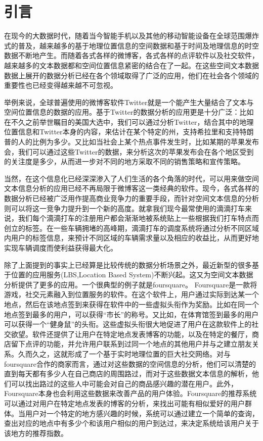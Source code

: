 \chapter{引言}

在现今的大数据时代，随着当今智能手机以及其他的移动智能设备在全球范围爆炸式的普及，越来越多的基于地理位置信息的空间数据和基于时间及地理信息的时空数据不断地产生。而随着各式各样的微博客，各式各样的点评软件以及社交软件，越来越多的文本数据都和空间位置信息紧密的结合在了一起。在这些空间文本数据数据上展开的数据分析已经在各个领域取得了广泛的应用，他们在社会各个领域的重要性也已经变得越来越不可忽视。

举例来说，全球普遍使用的微博客软件Twitter就是一个能产生大量结合了文本与空间位置信息的数据的应用。基于Twitter的数据分析的应用更是十分广泛：比如在不久之前举世瞩目的美国大选中，我们可以通过分析Twitter，结合其中的地理位置信息和Twitter本身的内容，来估计在某个特定的州，支持希拉里和支持特朗普的人的比例为多少。又比如当社会上某个热点事件发生时，比如某期的苹果发布会，我们可以通过这些Twitter的数据，来分析这次的苹果发布会在各个地区受到的关注度是多少，从而进一步对不同的地方采取不同的销售策略和宣传策略。

当然，在这个信息化已经深深渗入了人们生活的各个角落的时代，可以用来做空间文本信息分析的应用已经不再局限于微博客这一类经典的软件。现今，各式各样的数据分析已经被广泛用作提高商业竞争力的重要手段，而针对空间文本信息的分析则可以将这一竞争力提升到一个新的高度。就拿我们现今最常使用的滴滴打车来说，我们每个滴滴打车的注册用户都会渐渐地被系统贴上一些根据我们打车特点而创立的标签。在一些车辆拥堵的高峰期，滴滴打车的调度系统将通过分析不同区域内用户的标签信息，来预计不同区域的车辆需求量以及相应的收益比，从而更好地实现车辆调度而使利益获得最大化。

除了上面提到的事实上已经算是比较传统的数据分析场景之外，最近新型的很多基于位置的应用服务(LBS,Location Based System)不断兴起。这又为空间文本数据分析提供了更多的应用。一个很典型的例子就是foursquare。 Foursquare是一款将游戏，社交元素融入到位置服务的软件。在这个软件上，用户通过实际到达某一个地点，然后在该地点签到来获得在软件中的一些虚拟头衔作为奖励。比如在同一个地点签到最多的用户，可以获得“市长”的称号。又比如，在体育馆签到最多的用户可以获得一个“健身鼠”的头衔。这些虚拟头衔很大地促进了用户在这款软件上的社交欲望。软件还提供了让用户在特定地点发表博客的功能，以及在特定的餐厅，商店留下点评的功能，并允许用户联系到过同一个地点的其他用户并与之建立朋友关系。久而久之，这就形成了一个基于实时地理位置的巨大社交网络。对与foursquare合作的商家而言，通过对这些数据的空间信息的分析，他们可以清楚的直到每天都有多少人在自己商店的周围路过，而对于这些数据文本信息的解析，他们可以找出路过的这些人中可能会对自己的商品感兴趣的潜在用户。此外，Foursquare本身也会利用这些数据来改善产品的用户体验。Foursquare的推荐系统可以通过对用户在特定地点发表的博客的分析，来找出可能有相似爱好的用户群体。当用户对一个特定的地方感兴趣的时候，系统可以通过建立一个简单的查询，查出对应的地点中有多少个和该用户相似的用户到达过，来决定系统给该用户关于该地方的推荐指数。


